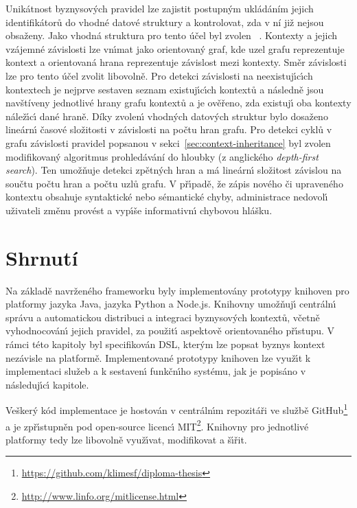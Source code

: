 Unikátnost byznysových pravidel lze zajistit postupným ukládáním jejich identifikátorů
do vhodné datové struktury a kontrolovat, zda v ní již nejsou obsaženy. Jako vhodná struktura
pro tento účel byl zvolen ~\cite{hopcroft1983data}.
Kontexty a jejich vzájemné závislosti lze vn\'{\i}mat jako
orientovan\'y graf, kde uzel grafu reprezentuje kontext
a orientovaná hrana reprezentuje závislost mezi kontexty.
Směr závislosti lze pro tento účel zvolit libovolně.
Pro detekci závislosti na neexistuj\'{\i}c\'{\i}ch kontextech je nejprve
sestaven seznam existuj\'{\i}c\'{\i}ch kontextů a následně jsou navštíveny
jednotlivé hrany grafu kontextů a je ověřeno, zda existuj\'{\i} oba kontexty
nálež\'{\i}c\'{\i} dané hraně. Díky zvolen\'{\i} vhodn\'ych datov\'ych struktur
bylo dosaženo lineárn\'{\i} časové složitosti v závislosti na počtu hran grafu.
Pro detekci cyklů v grafu závislosti pravidel popsanou v sekci~\ref{sec:context-inheritance} byl
zvolen modifikovaný algoritmus prohledávání do hloubky (z anglického \textit{depth-first search}).
Ten umožňuje detekci zpětných hran a má lineárn\'{\i} složitost závislou na součtu počtu
hran a počtu uzlů grafu. V př\'{\i}padě, že zápis nového či upraveného kontextu obsahuje syntaktické
nebo sémantické chyby, administrace nedovol\'{\i} uživateli změnu provést a vyp\'{\i}še informativn\'{\i}
chybovou hlášku.

\section{Shrnutí}

Na základě navrženého frameworku byly implementovány prototypy
knihoven pro platformy jazyka Java, jazyka Python a
Node.js. Knihovny umožňuj\'{\i} centráln\'{\i} správu a automatickou distribuci a integraci
byznysov\'ych kontextů, včetně vyhodnocován\'{\i} jejich pravidel, za
použit\'{\i} aspektově orientovaného př\'{\i}stupu.
V rámci této kapitoly byl specifikován \gls{DSL}, kter\'ym lze popsat
byznys kontext nezávisle na platformě.
Implementované prototypy knihoven lze využ\'{\i}t k implementaci služeb a k sestaven\'{\i}
funkčn\'{\i}ho systému, jak je popisáno v následuj\'{\i}c\'{\i} kapitole.

Vešker\'y kód implementace je hostován v centráln\'{\i}m repozitáři
ve službě GitHub\footnote{\url{https://github.com/klimesf/diploma-thesis}}
a je zpř\'{\i}stupněn pod open-source licenc\'{\i} \gls{MIT}\footnote{\url{http://www.linfo.org/mitlicense.html}}.
Knihovny pro jednotlivé platformy tedy lze libovolně
využ\'{\i}vat, modifikovat a š\'{\i}řit.
